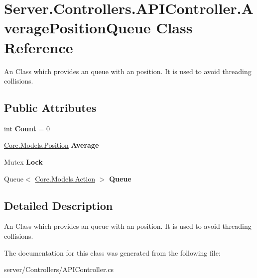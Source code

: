 \hypertarget{classServer_1_1Controllers_1_1APIController_1_1AveragePositionQueue}{\section{Server.\-Controllers.\-A\-P\-I\-Controller.\-Average\-Position\-Queue Class Reference}
\label{classServer_1_1Controllers_1_1APIController_1_1AveragePositionQueue}
}


An Class which provides an queue with an position. It is used to avoid threading collisions.  


\subsection*{Public Attributes}
\begin{DoxyCompactItemize}
\item 
\hypertarget{classServer_1_1Controllers_1_1APIController_1_1AveragePositionQueue_afe0ce38ffb7112888253f2047cb62260}{int {\bfseries Count} = 0}\label{classServer_1_1Controllers_1_1APIController_1_1AveragePositionQueue_afe0ce38ffb7112888253f2047cb62260}

\item 
\hypertarget{classServer_1_1Controllers_1_1APIController_1_1AveragePositionQueue_ad97233578791c4725b31c4b873c1b52e}{\hyperlink{classCore_1_1Models_1_1Position}{Core.\-Models.\-Position} {\bfseries Average}}\label{classServer_1_1Controllers_1_1APIController_1_1AveragePositionQueue_ad97233578791c4725b31c4b873c1b52e}

\item 
\hypertarget{classServer_1_1Controllers_1_1APIController_1_1AveragePositionQueue_ad6170762b6e4b77d8c1f09342080cb46}{Mutex {\bfseries Lock}}\label{classServer_1_1Controllers_1_1APIController_1_1AveragePositionQueue_ad6170762b6e4b77d8c1f09342080cb46}

\item 
\hypertarget{classServer_1_1Controllers_1_1APIController_1_1AveragePositionQueue_ac983e9072abb8aab90f443f9bccaf231}{Queue$<$ \hyperlink{classCore_1_1Models_1_1Action}{Core.\-Models.\-Action} $>$ {\bfseries Queue}}\label{classServer_1_1Controllers_1_1APIController_1_1AveragePositionQueue_ac983e9072abb8aab90f443f9bccaf231}

\end{DoxyCompactItemize}


\subsection{Detailed Description}
An Class which provides an queue with an position. It is used to avoid threading collisions. 



The documentation for this class was generated from the following file\-:\begin{DoxyCompactItemize}
\item 
server/\-Controllers/A\-P\-I\-Controller.\-cs\end{DoxyCompactItemize}
